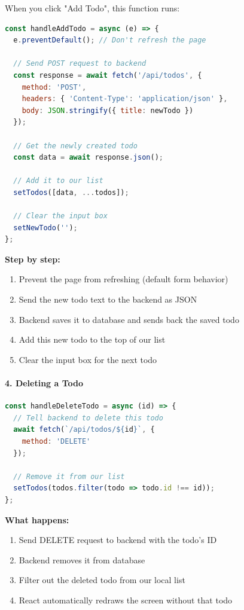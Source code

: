 \documentclass[12pt,a4paper]{article}
\begin{document}
When you click "Add Todo", this function runs:

\begin{lstlisting}[language=JavaScript, caption=Adding a todo]
const handleAddTodo = async (e) => {
  e.preventDefault(); // Don't refresh the page
  
  // Send POST request to backend
  const response = await fetch('/api/todos', {
    method: 'POST',
    headers: { 'Content-Type': 'application/json' },
    body: JSON.stringify({ title: newTodo })
  });
  
  // Get the newly created todo
  const data = await response.json();
  
  // Add it to our list
  setTodos([data, ...todos]);
  
  // Clear the input box
  setNewTodo('');
};
\end{lstlisting}

\textbf{Step by step:}
\begin{enumerate}
    \item Prevent the page from refreshing (default form behavior)
    \item Send the new todo text to the backend as JSON
    \item Backend saves it to database and sends back the saved todo
    \item Add this new todo to the top of our list
    \item Clear the input box for the next todo
\end{enumerate}

\paragraph{4. Deleting a Todo}

\begin{lstlisting}[language=JavaScript, caption=Deleting a todo]
const handleDeleteTodo = async (id) => {
  // Tell backend to delete this todo
  await fetch(`/api/todos/${id}`, {
    method: 'DELETE'
  });
  
  // Remove it from our list
  setTodos(todos.filter(todo => todo.id !== id));
};
\end{lstlisting}

\textbf{What happens:}
\begin{enumerate}
    \item Send DELETE request to backend with the todo's ID
    \item Backend removes it from database
    \item Filter out the deleted todo from our local list
    \item React automatically redraws the screen without that todo
\end{enumerate}
\end{document}
